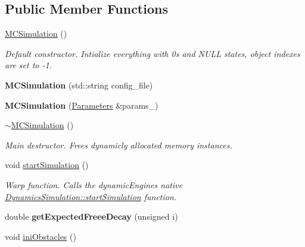 \subsection*{Public Member Functions}
\begin{DoxyCompactItemize}
\item 
\hyperlink{class_m_c_simulation_a89f56682a13f0bcb2c53d191ca336e35}{M\+C\+Simulation} ()
\begin{DoxyCompactList}\small\item\em Default constructor. Intialize everything with 0\textquotesingle{}s and N\+U\+LL states, object indexes are set to -\/1. \end{DoxyCompactList}\item 
\mbox{\label{class_m_c_simulation_a5b2bdb95de31810a0d2ee54174e83f98}} 
{\bfseries M\+C\+Simulation} (std\+::string config\+\_\+file)
\item 
\mbox{\label{class_m_c_simulation_a76ac3d50d345d249cacc913273b2bd34}} 
{\bfseries M\+C\+Simulation} (\hyperlink{class_parameters}{Parameters} \&params\+\_\+)
\item 
\mbox{\label{class_m_c_simulation_a859c6ddce0e3c07db0159b2e4906b7ca}} 
\hyperlink{class_m_c_simulation_a859c6ddce0e3c07db0159b2e4906b7ca}{$\sim$\+M\+C\+Simulation} ()
\begin{DoxyCompactList}\small\item\em Main destructor. Frees dynamicly allocated memory instances. \end{DoxyCompactList}\item 
void \hyperlink{class_m_c_simulation_aa305f18bd48dd26f916cc9c006a8dec8}{start\+Simulation} ()
\begin{DoxyCompactList}\small\item\em Warp function. Calls the dynamic\+Engine\textquotesingle{}s native \hyperlink{class_dynamics_simulation_a00cf4a6cbde1ef708fdbd58e8d8a7727}{Dynamics\+Simulation\+::start\+Simulation} function. \end{DoxyCompactList}\item 
\mbox{\label{class_m_c_simulation_aff302334b2743a583b5d6f642d841f2f}} 
double {\bfseries get\+Expected\+Freee\+Decay} (unsigned i)
\item 
void \hyperlink{class_m_c_simulation_aa60234e3f6d2a100c8b03e4f304b07f4}{ini\+Obstacles} ()
\end{DoxyCompactItemize}
